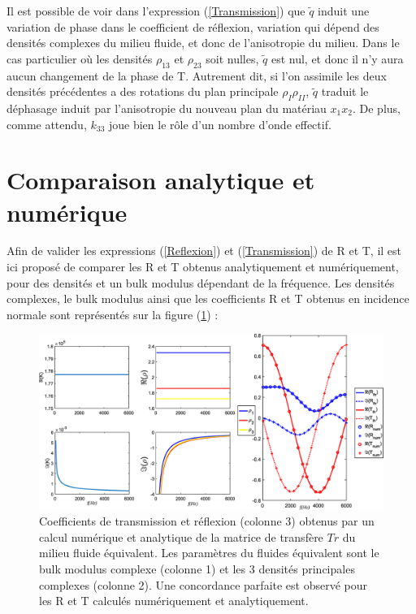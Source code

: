 \documentclass[12pt]{report}
\begin{document}
    Il est possible de voir dans l'expression (\ref{Transmission}) que $\tilde{q}$ induit une variation de phase dans le coefficient de réflexion, variation qui dépend des densités complexes du milieu fluide, et donc de l'anisotropie du milieu. Dans le cas particulier où les densités $\rho_{13}$ et $\rho_{23}$ soit nulles, $\tilde{q}$ est nul, et donc il n'y aura aucun changement de la phase de T. Autrement dit, si l'on assimile les deux densités précédentes a des rotations du plan principale $\rho_I\rho_{II}$, $\tilde{q}$ traduit le déphasage induit par l'anisotropie du nouveau plan du matériau $x_1x_2$. De plus, comme attendu, $k_{33}$ joue bien le rôle d'un nombre d'onde effectif.
    
\section{Comparaison analytique et numérique}
\label{Ch_Dir_S_Comp}
    Afin de valider les expressions (\ref{Reflexion}) et (\ref{Transmission}) de R et T, il est ici proposé de comparer les R et T obtenus analytiquement et numériquement, pour des densités et un bulk modulus dépendant de la fréquence. Les densités complexes, le bulk modulus ainsi que les coefficients R et T obtenus en incidence normale sont représentés sur la figure (\ref{RT_comp}) :
\begin{figure}[ht!]
    \centering
    \includegraphics[scale=0.4]{RT_num_th.eps}
    \caption{ Coefficients de transmission et réflexion (colonne 3) obtenus par un calcul numérique et analytique de la matrice de transfère $Tr$ du milieu fluide équivalent. Les paramètres du fluides équivalent sont le bulk modulus complexe (colonne 1) et les 3 densités principales complexes (colonne 2). Une concordance parfaite est observé pour les R et T calculés numériquement et analytiquement.}
    \label{RT_comp}
\end{figure}
    
\end{document}
